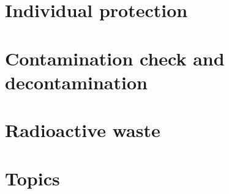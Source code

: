 \section{Individual protection}
\section{Contamination check and decontamination}%
\section{Radioactive waste}
\section{Topics}